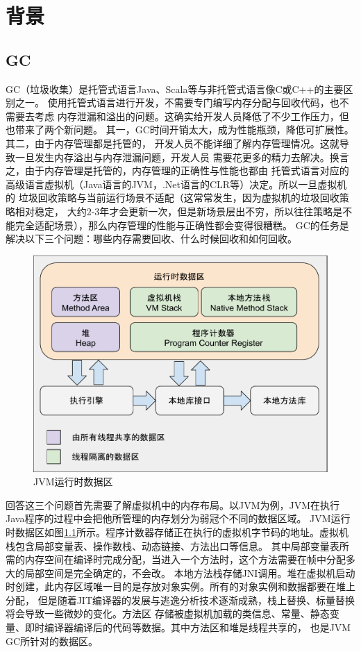 \chapter{背景}

\section{GC}
GC（垃圾收集）是托管式语言Java、Scala等与非托管式语言像C或C++的主要区别之一。
使用托管式语言进行开发，不需要专门编写内存分配与回收代码，也不需要去考虑
内存泄漏和溢出的问题。这确实给开发人员降低了不少工作压力，但也带来了两个新问题。
其一，GC时间开销太大，成为性能瓶颈，降低可扩展性。其二，由于内存管理都是托管的，
开发人员不能详细了解内存管理情况。这就导致一旦发生内存溢出与内存泄漏问题，开发人员
需要花更多的精力去解决。换言之，由于内存管理是托管的，内存管理的正确性与性能也都由
托管式语言对应的高级语言虚拟机（Java语言的JVM，.Net语言的CLR等）决定。所以一旦虚拟机的
垃圾回收策略与当前运行场景不适配（这常常发生，因为虚拟机的垃圾回收策略相对稳定，
大约2-3年才会更新一次，但是新场景层出不穷，所以往往策略是不能完全适配场景），那么内存管理的性能与正确性都会变得很糟糕。
GC的任务是解决以下三个问题：哪些内存需要回收、什么时候回收和如何回收。

\begin{figure}[h]
    \centering
    \includegraphics[width=12cm]{figure/JVM_memory_layout.pdf}
    \caption{JVM运行时数据区\cite{Understand_JVM}}
    \label{jvm_memory_layout}
\end{figure}

回答这三个问题首先需要了解虚拟机中的内存布局。以JVM为例，JVM在执行Java程序的过程中会把他所管理的内存划分为弱冠个不同的数据区域。
JVM运行时数据区如图\ref{jvm_memory_layout}所示。程序计数器存储正在执行的虚拟机字节码的地址。虚拟机栈包含局部变量表、操作数栈、动态链接、方法出口等信息。
其中局部变量表所需的内存空间在编译时完成分配，当进入一个方法时，这个方法需要在帧中分配多大的局部空间是完全确定的，不会改。
本地方法栈存储JNI调用。堆在虚拟机启动时创建，此内存区域唯一目的是存放对象实例。所有的对象实例和数据都要在堆上分配，
但是随着JIT编译器的发展与逃逸分析技术逐渐成熟，栈上替换、标量替换将会导致一些微妙的变化。方法区
存储被虚拟机加载的类信息、常量、静态变量、即时编译器编译后的代码等数据。其中方法区和堆是线程共享的，
也是JVM GC所针对的数据区。

